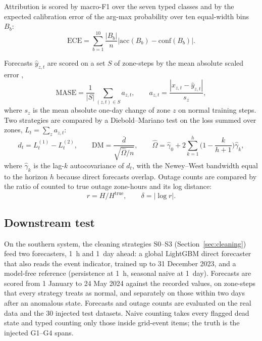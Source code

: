 Attribution is scored by macro-F1 over the seven typed classes and by the expected calibration error \cite{guo2017calibration} of the arg-max probability over ten equal-width bins $B_b$:
\begin{equation}
\mathrm{ECE} = \sum_{b=1}^{10} \frac{|B_b|}{n} \left| \mathrm{acc}(B_b) - \mathrm{conf}(B_b) \right|.
\label{eq:ece}
\end{equation}

Forecasts $\hat{y}_{z,t}$ are scored on a set $S$ of zone-steps by the mean absolute scaled error \cite{hyndman2006mase},
\begin{equation}
\mathrm{MASE} = \frac{1}{|S|} \sum_{(z,t) \in S} a_{z,t}, \qquad a_{z,t} = \frac{|x_{z,t} - \hat{y}_{z,t}|}{s_z},
\label{eq:mase}
\end{equation}
where $s_z$ is the mean absolute one-day change of zone $z$ on normal training steps. Two strategies are compared by a Diebold--Mariano test \cite{diebold1995dm} on the loss summed over zones, $L_t = \sum_z a_{z,t}$:
\begin{equation}
d_t = L^{(1)}_t - L^{(2)}_t, \qquad \mathrm{DM} = \frac{\bar{d}}{\sqrt{\hat{\Omega}/n}}, \qquad
\hat{\Omega} = \hat{\gamma}_0 + 2 \sum_{k=1}^{h} \Big(1 - \frac{k}{h+1}\Big) \hat{\gamma}_k,
\label{eq:dm}
\end{equation}
where $\hat{\gamma}_k$ is the lag-$k$ autocovariance of $d_t$, with the Newey--West bandwidth \cite{newey1987hac} equal to the horizon $h$ because direct forecasts overlap. Outage counts are compared by the ratio of counted to true outage zone-hours and its log distance:
\begin{equation}
r = H / H^{\mathrm{true}}, \qquad \delta = |\log r|.
\label{eq:outage}
\end{equation}

\subsection{Downstream test}\label{sec:downstream}

On the southern system, the cleaning strategies S0--S3 (Section~\ref{sec:cleaning}) feed two forecasters, 1~h and 1~day ahead: a global LightGBM direct forecaster that also reads the event indicator, trained up to 31 December 2023, and a model-free reference (persistence at 1~h, seasonal naive at 1~day). Forecasts are scored from 1 January to 24 May 2024 against the recorded values, on zone-steps that every strategy treats as normal, and separately on those within two days after an anomalous state. Forecasts and outage counts are evaluated on the real data and the 30 injected test datasets. Naive counting takes every flagged dead state and typed counting only those inside grid-event items; the truth is the injected G1--G4 spans.

